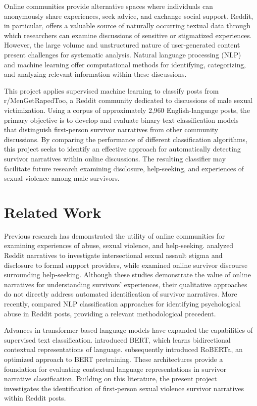 \documentclass[11pt,a4paper]{article}
\begin{document}
Online communities provide alternative spaces where individuals can anonymously share experiences, seek advice, and exchange social support. Reddit, in particular, offers a valuable source of naturally occurring textual data through which researchers can examine discussions of sensitive or stigmatized experiences. However, the large volume and unstructured nature of user-generated content present challenges for systematic analysis. Natural language processing (NLP) and machine learning offer computational methods for identifying, categorizing, and analyzing relevant information within these discussions.

This project applies supervised machine learning to classify posts from r/MenGetRapedToo, a Reddit community dedicated to discussions of male sexual victimization. Using a corpus of approximately 2,960 English-language posts, the primary objective is to develop and evaluate binary text classification models that distinguish first-person survivor narratives from other community discussions. By comparing the performance of different classification algorithms, this project seeks to identify an effective approach for automatically detecting survivor narratives within online discussions. The resulting classifier may facilitate future research examining disclosure, help-seeking, and experiences of sexual violence among male survivors.

\section{Related Work}

Previous research has demonstrated the utility of online communities for examining experiences of abuse, sexual violence, and help-seeking. \citet{lanthierComingOutCloset2023a} analyzed Reddit narratives to investigate intersectional sexual assault stigma and disclosure to formal support providers, while \citet{abaviExplorationSexualAssault2020} examined online survivor discourse surrounding help-seeking. Although these studies demonstrate the value of online narratives for understanding survivors' experiences, their qualitative approaches do not directly address automated identification of survivor narratives. More recently, \citet{ashkenaziDecodingPsychologicalAbuse2026} compared NLP classification approaches for identifying psychological abuse in Reddit posts, providing a relevant methodological precedent.

Advances in transformer-based language models have expanded the capabilities of supervised text classification. \citet{devlin-etal-2019-bert} introduced BERT, which learns bidirectional contextual representations of language. \citet{liuRoBERTaRobustlyOptimized2019a} subsequently introduced RoBERTa, an optimized approach to BERT pretraining. These architectures provide a foundation for evaluating contextual language representations in survivor narrative classification. Building on this literature, the present project investigates the identification of first-person sexual violence survivor narratives within Reddit posts.
\end{document}

